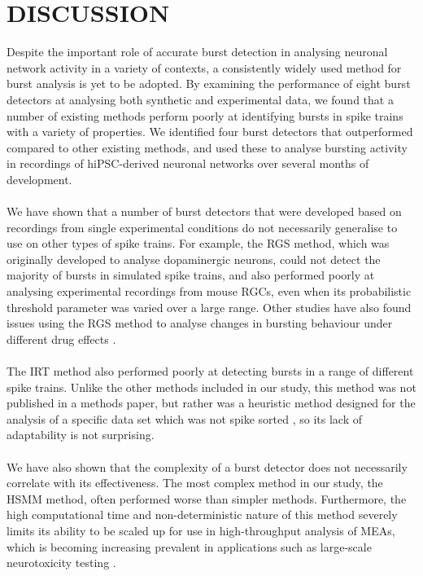 \documentclass[12pt, titlepage]{article}
\begin{document}
	\section*{DISCUSSION}
	Despite the important role of accurate burst detection in analysing neuronal network activity in a variety of contexts, a consistently widely used method for burst analysis is yet to be adopted. By examining the performance of eight burst detectors at analysing both synthetic and experimental data, we found that a number of existing methods perform poorly at identifying bursts in spike trains with a variety of properties. We identified four burst detectors that outperformed compared to other existing methods, and used these to analyse bursting activity in recordings of hiPSC-derived neuronal networks over several months of development.
	\\ \\We have shown that a number of burst detectors that were developed based on recordings from single experimental conditions do not necessarily generalise to use on other types of spike trains. For example, the RGS method, which was originally developed to analyse dopaminergic neurons, could not detect the majority of bursts in simulated spike trains, and also performed poorly at analysing experimental recordings from mouse RGCs, even when its probabilistic threshold parameter was varied over a large range. Other studies have also found issues using the RGS method to analyse changes in bursting behaviour under different drug effects \cite{Eisenman2015}. 
	\\ \\The IRT method also performed poorly at detecting bursts in a range of different spike trains. Unlike the other methods included in our study, this method was not published in a methods paper, but rather was a heuristic method designed for the analysis of a specific data set which was not spike sorted \cite{Hennig2011}, so its lack of adaptability is not surprising.
	\\ \\We have also shown that the complexity of a burst detector does not necessarily correlate with its effectiveness. The most complex method in our study, the HSMM method, often performed worse than simpler methods. Furthermore, the high computational time and non-deterministic nature of this method severely limits its ability to be scaled up for use in high-throughput analysis of MEAs, which is becoming increasing prevalent in applications such as large-scale neurotoxicity testing \cite{Nicolas2014}.
\end{document}
